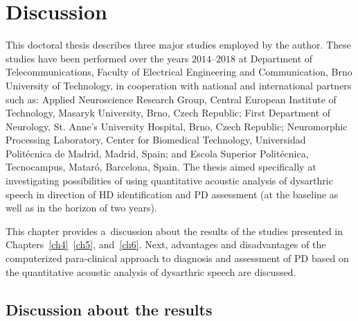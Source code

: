 \chapter[Discussion]{Discussion}
\label{ch7}

This doctoral thesis describes three major studies employed by the author. These studies have been performed over the years $2014$--$2018$ at Department of Telecommunications, Faculty of Electrical Engineering and Communication, Brno University of Technology, in cooperation with national and international partners such as: Applied Neuroscience Research Group, Central European Institute of Technology, Masaryk University, Brno, Czech Republic; First Department of Neurology, St. Anne's University Hospital, Brno, Czech Republic; Neuromorphic Processing Laboratory, Center for Biomedical Technology, Universidad Polit\'{e}cnica de Madrid, Madrid, Spain; and Escola Superior Polit\'{e}cnica, Tecnocampus, Matar\'{o}, Barcelona, Spain. The thesis aimed specifically at investigating possibilities of using quantitative acoustic analysis of dysarthric speech in direction of HD identification and PD assessment (at the baseline as well as in the horizon of two years).

This chapter provides a~discussion about the results of the studies presented in Chapters~\ref{ch4}~\ref{ch5}, and~\ref{ch6}. Next, advantages and disadvantages of the computerized para-clinical approach to diagnosis and assessment of PD based on the quantitative acoustic analysis of dysarthric speech are discussed.

\section{Discussion about the results}
\label{ch7_1}

